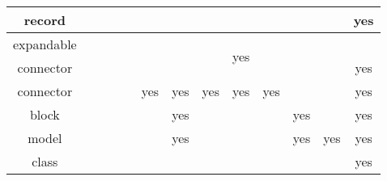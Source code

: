 \begin{table}[H]
{\begin{tabular}{|c|c|c|c|c|c|c|c|c|c|c|c|c|}
    record            &                          &                           &                                            &                      &                          &                          &                          &                          &                            &                          &                        & \multirow{-2}{*}{\cellcolor{lightgray}yes} \\
    \hline
    expandable        &                          &                           &                                            &                      &                          &                          &                          & \multirow{2}{*}{yes}     &                            &                          &                        & \cellcolor{lightgray}                      \\
    connector         &                          &                           &                                            &                      &                          &                          &                          &                          &                            &                          &                        & \multirow{-2}{*}{\cellcolor{lightgray}yes} \\
    \hline
    connector         &                          &                           &                                            &                      & \cellcolor{lightgray}yes & \cellcolor{lightgray}yes & \cellcolor{lightgray}yes & \cellcolor{lightgray}yes & yes                        &                          &                        & \cellcolor{lightgray}yes                   \\
    \hline
    block             &                          &                           &                                            &                      &                          & \cellcolor{lightgray}yes &                          &                          &                            & yes                      &                        & \cellcolor{lightgray}yes                   \\
    \hline
    model             &                          &                           &                                            &                      &                          & \cellcolor{lightgray}yes &                          &                          &                            & \cellcolor{lightgray}yes & yes                    & \cellcolor{lightgray}yes                   \\
    \hline
    class             &                          &                           &                                            &                      &                          &                          &                          &                          &                            &                          &                        & yes                                        \\
    \hline
  \end{tabular}
  \ifpdf}\else\fi%
\end{table}

